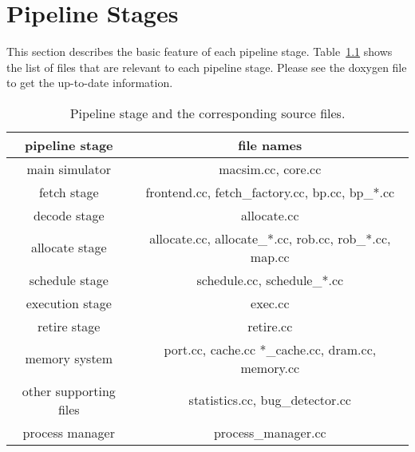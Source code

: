 


\chapter{Pipeline Stages}

This section describes the basic feature of each pipeline stage. 
Table~\ref{table:pipeline} shows the list of files that are relevant to each pipeline stage. 
Please see the doxygen file to get the up-to-date information. 


\begin{table}[htb]
\begin{footnotesize}
\begin{center}
\caption{Pipeline stage and the corresponding source files.}
\label{table:pipeline}
\begin{tabular}{|c||c|}
\hline 
pipeline stage         & file names                                             \\ \hline \hline 
main simulator         & macsim.cc, core.cc                                     \\ \hline 
fetch stage            & frontend.cc, fetch\_factory.cc, bp.cc, bp\_*.cc        \\ \hline 
decode stage           & allocate.cc                                            \\ \hline 
allocate stage         & allocate.cc, allocate\_*.cc, rob.cc, rob\_*.cc, map.cc \\ \hline 
schedule stage         & schedule.cc, schedule\_*.cc                            \\ \hline 
execution stage        & exec.cc                                                \\ \hline 
retire stage           & retire.cc                                              \\ \hline 
memory system          & port.cc, cache.cc *\_cache.cc, dram.cc, memory.cc      \\ \hline \hline
other supporting files & statistics.cc, bug\_detector.cc                        \\ \hline \hline 
process manager        & process\_manager.cc                                    \\ \hline 
\end{tabular}
\end{center}
\end{footnotesize}
\end{table}



